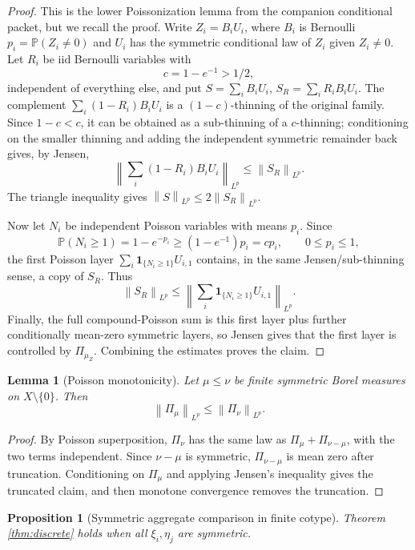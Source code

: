 \documentclass[11pt]{article}
\newtheorem{proposition}{Proposition}
\newtheorem{lemma}{Lemma}
\newcommand{\Pp}{\mathbb P}
\newcommand{\norm}[1]{\left\lVert #1\right\rVert}
\newcommand{\1}{\mathbf 1}
\begin{document}
\begin{proof}
This is the lower Poissonization lemma from the companion conditional packet,
but we recall the proof.  Write \(Z_i=B_iU_i\), where \(B_i\) is Bernoulli
\(p_i=\Pp(Z_i\ne0)\) and \(U_i\) has the symmetric conditional law of \(Z_i\)
given \(Z_i\ne0\).  Let \(R_i\) be iid Bernoulli variables with
\[
  c=1-e^{-1}>1/2,
\]
independent of everything else, and put \(S=\sum_iB_iU_i\),
\(S_R=\sum_iR_iB_iU_i\).  The complement
\(\sum_i(1-R_i)B_iU_i\) is a \((1-c)\)-thinning of the original family.  Since
\(1-c<c\), it can be obtained as a sub-thinning of a \(c\)-thinning; conditioning
on the smaller thinning and adding the independent symmetric remainder back
gives, by Jensen,
\[
  \left\|\sum_i(1-R_i)B_iU_i\right\|_{L^p}
  \le \norm{S_R}_{L^p}.
\]
The triangle inequality gives \(\norm{S}_{L^p}\le 2\norm{S_R}_{L^p}\).

Now let \(N_i\) be independent Poisson variables with means \(p_i\).  Since
\[
  \Pp(N_i\ge1)=1-e^{-p_i}\ge(1-e^{-1})p_i=cp_i,\qquad 0\le p_i\le1,
\]
the first Poisson layer \(\sum_i\mathbf 1_{\{N_i\ge1\}}U_{i,1}\) contains, in
the same Jensen/sub-thinning sense, a copy of \(S_R\).  Thus
\[
  \norm{S_R}_{L^p}
  \le
  \left\|\sum_i \mathbf 1_{\{N_i\ge1\}}U_{i,1}\right\|_{L^p}.
\]
Finally, the full compound-Poisson sum is this first layer plus further
conditionally mean-zero symmetric layers, so Jensen gives that the first layer
is controlled by \(\Pi_{\mu_Z}\).  Combining the estimates proves the claim.
\end{proof}

\begin{lemma}[Poisson monotonicity]
\label{lem:monotone}
Let \(\mu\le\nu\) be finite symmetric Borel measures on \(X\setminus\{0\}\).
Then
\[
  \norm{\Pi_\mu}_{L^p}\le\norm{\Pi_\nu}_{L^p}.
\]
\end{lemma}

\begin{proof}
By Poisson superposition, \(\Pi_\nu\) has the same law as
\(\Pi_\mu+\Pi_{\nu-\mu}\), with the two terms independent.  Since
\(\nu-\mu\) is symmetric, \(\Pi_{\nu-\mu}\) is mean zero after truncation.
Conditioning on \(\Pi_\mu\) and applying Jensen's inequality gives the
truncated claim, and then monotone convergence removes the truncation.
\end{proof}

\begin{proposition}[Symmetric aggregate comparison in finite cotype]
\label{prop:symmetric}
Theorem \ref{thm:discrete} holds when all \(\xi_i,\eta_j\) are symmetric.
\end{proposition}
\end{document}
